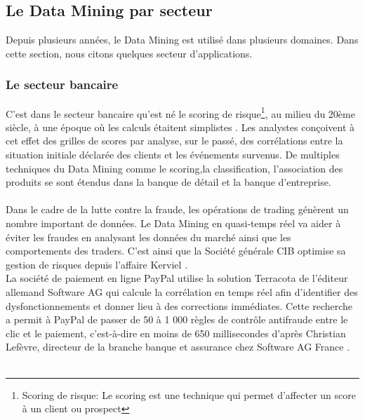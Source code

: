 \documentclass[11pt,a4paper]{report}
\begin{document}
 \subsection{Le Data Mining par secteur}
 Depuis plusieurs années, le Data Mining est utilisé dans plusieurs domaines. Dans cette section, nous citons quelques secteur d'applications.
\subsubsection{Le secteur bancaire}
%
%
   C'est dans le secteur bancaire qu'est né le scoring de risque\footnote{Scoring de risque: Le scoring est une technique qui permet d’affecter un score à un client ou prospect}, au milieu du 20ème siècle, à une époque où les calculs étaitent simplistes \cite{stephane}. Les analystes  conçoivent à cet effet des grilles de scores par analyse, sur le passé, des corrélations entre la situation initiale déclarée des clients et les événements survenus.
   De multiples techniques du Data Mining comme le scoring,la classification, l'association des produits se sont étendus dans la banque de détail et la banque d'entreprise. \\\\
   
  Dans le cadre de la lutte contre la fraude, les opérations de trading génèrent un nombre important de données. Le Data Mining en quasi-temps réel va aider à éviter les fraudes en analysant les données du marché ainsi que les comportements des traders. C'est ainsi que la Société générale CIB optimise sa gestion de risques depuis l'affaire Kerviel \cite{banque_fraude}.\\ La société de paiement en ligne PayPal utilise la solution Terracota de l'éditeur allemand Software AG qui calcule la corrélation en temps réel afin d'identifier des dysfonctionnements et donner lieu à des corrections immédiates. Cette recherche a permit à PayPal de passer de 50 à 1 000 règles de contrôle antifraude entre le clic et le paiement, c'est-à-dire en moins de 650 millisecondes d'après Christian Lefèvre, directeur de la branche banque et assurance chez Software AG France \cite{banque_fraude}.\\\\ 
  
\end{document}
